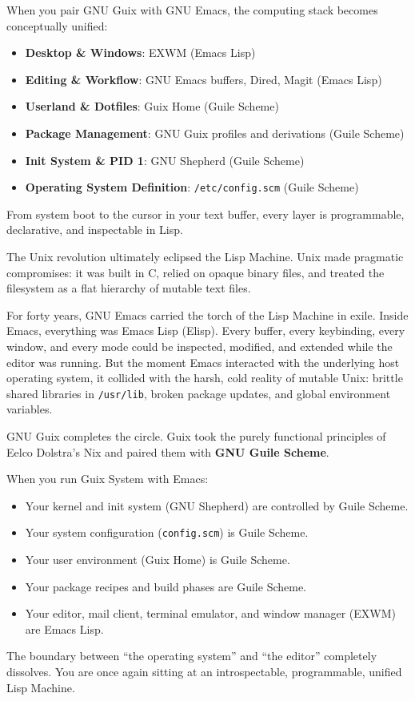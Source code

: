 \begin{protipbox}
When you pair GNU Guix with GNU Emacs, the computing stack becomes conceptually unified:
\begin{itemize}
  \item \textbf{Desktop \& Windows}: EXWM (Emacs Lisp)
  \item \textbf{Editing \& Workflow}: GNU Emacs buffers, Dired, Magit (Emacs Lisp)
  \item \textbf{Userland \& Dotfiles}: Guix Home (Guile Scheme)
  \item \textbf{Package Management}: GNU Guix profiles and derivations (Guile Scheme)
  \item \textbf{Init System \& PID 1}: GNU Shepherd (Guile Scheme)
  \item \textbf{Operating System Definition}: \texttt{/etc/config.scm} (Guile Scheme)
\end{itemize}
From system boot to the cursor in your text buffer, every layer is programmable, declarative, and inspectable in Lisp.
\end{protipbox}

The Unix revolution ultimately eclipsed the Lisp Machine. Unix made pragmatic compromises: it was built in C, relied on opaque binary files, and treated the filesystem as a flat hierarchy of mutable text files. 

For forty years, GNU Emacs carried the torch of the Lisp Machine in exile. Inside Emacs, everything was Emacs Lisp (Elisp). Every buffer, every keybinding, every window, and every mode could be inspected, modified, and extended while the editor was running. But the moment Emacs interacted with the underlying host operating system, it collided with the harsh, cold reality of mutable Unix: brittle shared libraries in \texttt{/usr/lib}, broken package updates, and global environment variables.

\begin{alchemybox}
GNU Guix completes the circle. Guix took the purely functional principles of Eelco Dolstra's Nix and paired them with \textbf{GNU Guile Scheme}. 

When you run Guix System with Emacs:
\begin{itemize}
  \item Your kernel and init system (GNU Shepherd) are controlled by Guile Scheme.
  \item Your system configuration (\texttt{config.scm}) is Guile Scheme.
  \item Your user environment (Guix Home) is Guile Scheme.
  \item Your package recipes and build phases are Guile Scheme.
  \item Your editor, mail client, terminal emulator, and window manager (EXWM) are Emacs Lisp.
\end{itemize}
The boundary between ``the operating system'' and ``the editor'' completely dissolves. You are once again sitting at an introspectable, programmable, unified Lisp Machine.
\end{alchemybox}

